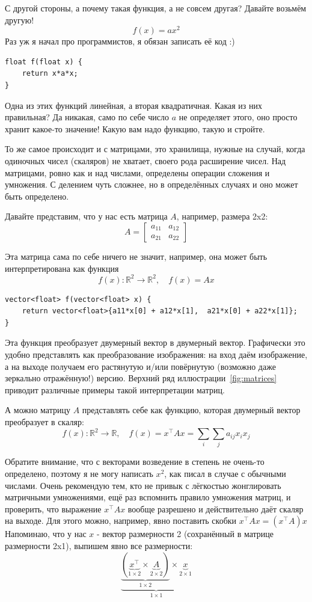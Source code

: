 \documentclass[notitlepage]{report}
\begin{document}
С другой стороны, а почему такая функция, а не совсем другая?
Давайте возьмём другую!
$$
f(x) = ax^2
$$
Раз уж я начал про программистов, я обязан записать её код :)
\begin{verbatim}
float f(float x) {
    return x*a*x;
}
\end{verbatim}

Одна из этих функций линейная, а вторая квадратичная. Какая из них правильная? Да никакая, само по себе число $a$ не определяет этого, оно просто хранит какое-то значение! Какую вам надо функцию, такую и стройте.

То же самое происходит и с матрицами, это хранилища, нужные на случай, когда одиночных чисел (скаляров) не хватает, своего рода расширение чисел.  Над матрицами, ровно как и над числами, определены операции сложения и умножения. С делением чуть сложнее, но в определённых случаях и оно может быть определено.

Давайте представим, что у нас есть матрица $A$, например, размера 2x2:
$$
A=\begin{bmatrix} a_{11} & a_{12} \\ a_{21} & a_{22}\end{bmatrix}
$$

Эта матрица сама по себе ничего не значит, например, она может быть интерпретирована как функция
$$
f(x) : \mathbb R^2 \rightarrow \mathbb R^2, \quad f(x) = Ax
$$

\begin{verbatim}
vector<float> f(vector<float> x) {
    return vector<float>{a11*x[0] + a12*x[1],  a21*x[0] + a22*x[1]};
}
\end{verbatim}

Эта функция преобразует двумерный вектор в двумерный вектор. Графически это удобно представлять как преобразование изображения: на вход даём изображение, а на выходе получаем его растянутую и/или повёрнутую (возможно даже зеркально отражённую!) версию.
Верхний ряд иллюстрации~\ref{fig:matrices} приводит различные примеры такой интерпретации матриц.


А можно матрицу $A$ представлять себе как функцию, которая двумерный вектор преобразует в скаляр:
$$
f(x) : \mathbb R^2 \rightarrow \mathbb R, \quad f(x) = x^\top A x = \sum\limits_i\sum\limits_j a_{ij}x_i x_j
$$

Обратите внимание, что с векторами возведение в степень не очень-то определено, поэтому я не могу написать $x^2$, как писал в случае с обычными числами. Очень рекомендую тем, кто не привык с лёгкостью жонглировать матричными умножениями, ещё раз вспомнить правило умножения матриц, и проверить, что выражение $x^\top A x$ вообще разрешено и действительно даёт скаляр на выходе.
Для этого можно, например, явно поставить скобки $x^\top A x = (x^\top A) x$
Напоминаю, что у нас $x$ - вектор размерности 2 (сохранённый в матрице размерности 2x1), выпишем явно все размерности:
$$
\underbrace{\underbrace{\left(\underbrace{x^\top}_{1\times 2} \times \underbrace{A}_{2\times 2}\right)}_{1\times 2} \times \underbrace{x}_{2\times 1}}_{1 \times 1}
$$
\end{document}
